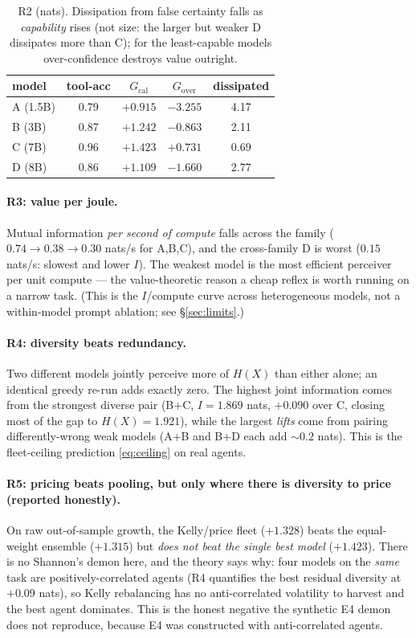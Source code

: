 \documentclass[11pt]{article}
\theoremstyle{plain}
\theoremstyle{definition}
\theoremstyle{remark}
\newcommand{\I}{I}
\begin{document}
\begin{table}[h]\centering
\begin{tabular}{lcccc}
\toprule
model & tool-acc & $G_{\text{cal}}$ & $G_{\text{over}}$ & dissipated \\
\midrule
A (1.5B) & 0.79 & $+0.915$ & $-3.255$ & 4.17 \\
B (3B)   & 0.87 & $+1.242$ & $-0.863$ & 2.11 \\
C (7B)   & 0.96 & $+1.423$ & $+0.731$ & 0.69 \\
D (8B)   & 0.86 & $+1.109$ & $-1.660$ & 2.77 \\
\bottomrule
\end{tabular}
\caption{R2 (nats). Dissipation from false certainty falls as \emph{capability} rises (not size: the larger but
weaker D dissipates more than C); for the least-capable models over-confidence destroys value outright.}
\label{tab:r2}
\end{table}

\paragraph{R3: value per joule.} Mutual information \emph{per second of compute} falls across the family
($0.74\to0.38\to0.30$ nats/s for A,B,C), and the cross-family D is worst ($0.15$ nats/s: slowest and lower $\I$).
The weakest model is the most efficient perceiver per unit compute --- the value-theoretic reason a cheap reflex
is worth running on a narrow task. (This is the $\I$/compute curve across heterogeneous models, not a
within-model prompt ablation; see \S\ref{sec:limits}.)

\paragraph{R4: diversity beats redundancy.} Two different models jointly perceive more of $H(X)$ than either
alone; an identical greedy re-run adds exactly zero. The highest joint information comes from the strongest
diverse pair (B+C, $\I=1.869$ nats, $+0.090$ over C, closing most of the gap to $H(X)=1.921$), while the largest
\emph{lifts} come from pairing differently-wrong weak models (A+B and B+D each add ${\sim}0.2$ nats). This is the
fleet-ceiling prediction \eqref{eq:ceiling} on real agents.

\paragraph{R5: pricing beats pooling, but only where there is diversity to price (reported honestly).} On raw
out-of-sample growth, the Kelly/price fleet ($+1.328$) beats the equal-weight ensemble ($+1.315$) but
\emph{does not beat the single best model} ($+1.423$). There is no Shannon's demon here, and the theory says
why: four models on the \emph{same} task are positively-correlated agents (R4 quantifies the best residual
diversity at $+0.09$ nats), so Kelly rebalancing has no anti-correlated volatility to harvest and the best agent
dominates. This is the honest negative the synthetic E4 demon does not reproduce, because E4 was constructed with
anti-correlated agents.
\end{document}
